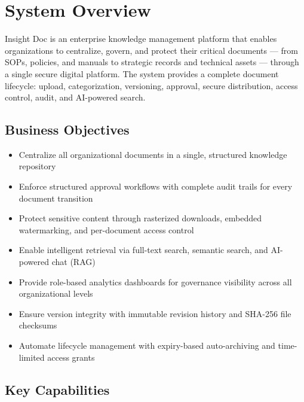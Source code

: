 \section{System Overview}

Insight Doc is an enterprise knowledge management platform that
enables organizations to centralize, govern, and protect their
critical documents --- from SOPs, policies, and manuals to
strategic records and technical assets --- through a single
secure digital platform. The system provides a complete document
lifecycle: upload, categorization, versioning, approval, secure
distribution, access control, audit, and AI-powered search.

\subsection{Business Objectives}
\begin{itemize}[leftmargin=18pt]
  \item Centralize all organizational documents in a single,
        structured knowledge repository
  \item Enforce structured approval workflows with complete
        audit trails for every document transition
  \item Protect sensitive content through rasterized downloads,
        embedded watermarking, and per-document access control
  \item Enable intelligent retrieval via full-text search,
        semantic search, and AI-powered chat (RAG)
  \item Provide role-based analytics dashboards for governance
        visibility across all organizational levels
  \item Ensure version integrity with immutable revision history
        and SHA-256 file checksums
  \item Automate lifecycle management with expiry-based
        auto-archiving and time-limited access grants
\end{itemize}

\subsection{Key Capabilities}

